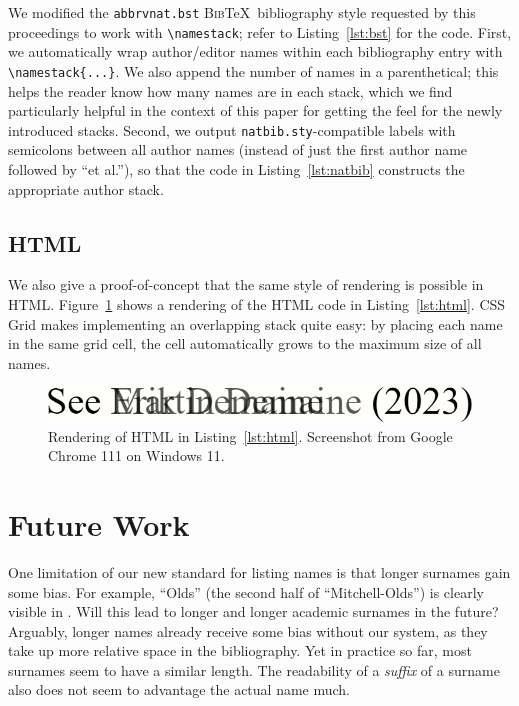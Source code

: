 \documentclass[natbib,authoryear]{sigtbd17-style}
\def\BibTeX{\textsc{Bib}\TeX}
\begin{document}
We modified the \texttt{abbrvnat.bst} \BibTeX\ bibliography style requested by
this proceedings to work with \lstinline|\namestack|;
refer to Listing~\ref{lst:bst} for the code.
First, we automatically wrap author/editor names within each bibliography entry
with \lstinline|\namestack{...}|.
We also append the number of names in a parenthetical;
this helps the reader know how many names are in each stack,
which we find particularly helpful in the context of this paper
for getting the feel for the newly introduced stacks.
Second, we output \texttt{natbib.sty}-compatible labels with semicolons
between all author names (instead of just the first author name followed by
``et al.''), so that the code in Listing~\ref{lst:natbib} constructs the
appropriate author stack.

\subsection{HTML}

We also give a proof-of-concept that the same style of rendering is
possible in HTML.  Figure~\ref{fig:html} shows a rendering
of the HTML code in Listing~\ref{lst:html}.
CSS Grid makes implementing an overlapping stack quite easy:
by placing each name in the same grid cell,
the cell automatically grows to the maximum size of all names.

\begin{figure}[htbp]
  \centering
  \includegraphics[scale=0.2]{figs/html.png}
  \caption{Rendering of HTML in Listing~\ref{lst:html}.
    Screenshot from Google Chrome 111 on Windows 11.}
  \label{fig:html}
\end{figure}

\begingroup
{}

\endgroup

\section{Future Work}

One limitation of our new standard for listing names is that longer surnames
gain some bias.
For example, ``Olds'' (the second half of ``Mitchell-Olds'')
is clearly visible in \citet{currency-fluctuation}.
Will this lead to longer and longer academic surnames in the future?
Arguably, longer names already receive some bias without our system,
as they take up more relative space in the bibliography.
Yet in practice so far, most surnames seem to have a similar length.
The readability of a \emph{suffix} of a surname also does not seem to
advantage the actual name much.
\end{document}
